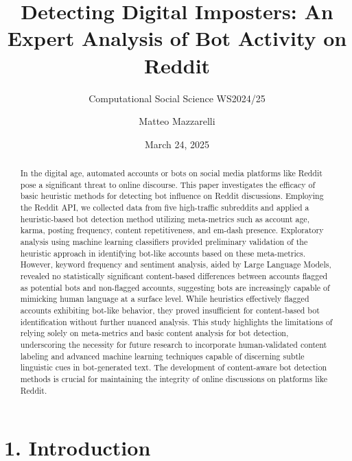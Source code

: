 \documentclass[
  12pt,
  letterpaper,
  DIV=11,
  numbers=noendperiod]{scrartcl}
\title{\textbf{Detecting Digital Imposters: An Expert Analysis of Bot
Activity on Reddit}}
\subtitle{Computational Social Science WS2024/25}
\author{Matteo Mazzarelli}
\date{March 24, 2025}
\renewcommand*\contentsname{Table of contents}
\newcommand\contentsname{Table of contents}
\begin{document}
\maketitle
\begin{abstract}
In the digital age, automated accounts or bots on social media platforms
like Reddit pose a significant threat to online discourse. This paper
investigates the efficacy of basic heuristic methods for detecting bot
influence on Reddit discussions. Employing the Reddit API, we collected
data from five high-traffic subreddits and applied a heuristic-based bot
detection method utilizing meta-metrics such as account age, karma,
posting frequency, content repetitiveness, and em-dash presence.
Exploratory analysis using machine learning classifiers provided
preliminary validation of the heuristic approach in identifying bot-like
accounts based on these meta-metrics. However, keyword frequency and
sentiment analysis, aided by Large Language Models, revealed no
statistically significant content-based differences between accounts
flagged as potential bots and non-flagged accounts, suggesting bots are
increasingly capable of mimicking human language at a surface level.
While heuristics effectively flagged accounts exhibiting bot-like
behavior, they proved insufficient for content-based bot identification
without further nuanced analysis. This study highlights the limitations
of relying solely on meta-metrics and basic content analysis for bot
detection, underscoring the necessity for future research to incorporate
human-validated content labeling and advanced machine learning
techniques capable of discerning subtle linguistic cues in bot-generated
text. The development of content-aware bot detection methods is crucial
for maintaining the integrity of online discussions on platforms like
Reddit.
\end{abstract}

\renewcommand*\contentsname{Table of contents}
{
\hypersetup{linkcolor=}
\setcounter{tocdepth}{3}
\tableofcontents
}

\section{\texorpdfstring{\textbf{1.
Introduction}}{1. Introduction}}\label{introduction}
\end{document}
